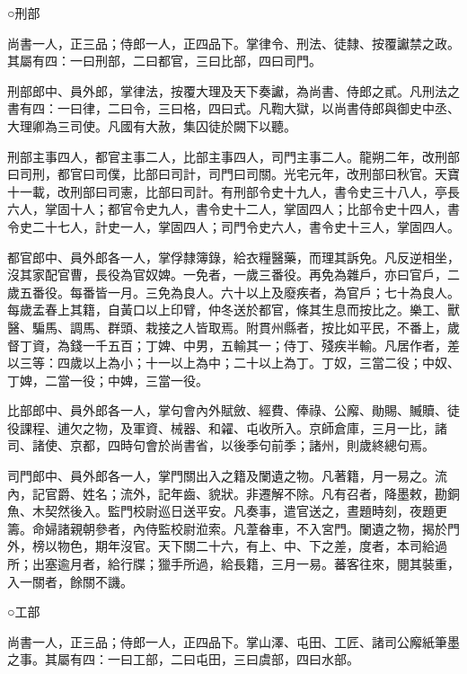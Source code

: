 \begin{pinyinscope}
 ○刑部



 尚書一人，正三品；侍郎一人，正四品下。掌律令、刑法、徒隸、按覆讞禁之政。其屬有四：一曰刑部，二曰都官，三曰比部，四曰司門。



 刑部郎中、員外郎，掌律法，按覆大理及天下奏讞，為尚書、侍郎之貳。凡刑法之書有四：一曰律，二曰令，三曰格，四曰式。凡鞫大獄，以尚書侍郎與御史中丞、大理卿為三司使。凡國有大赦，集囚徒於闕下以聽。



 刑部主事四人，都官主事二人，比部主事四人，司門主事二人。龍朔二年，改刑部曰司刑，都官曰司僕，比部曰司計，司門曰司關。光宅元年，改刑部曰秋官。天寶十一載，改刑部曰司憲，比部曰司計。有刑部令史十九人，書令史三十八人，亭長六人，掌固十人；都官令史九人，書令史十二人，掌固四人；比部令史十四人，書令史二十七人，計史一人，掌固四人；司門令史六人，書令史十三人，掌固四人。



 都官郎中、員外郎各一人，掌俘隸簿錄，給衣糧醫藥，而理其訴免。凡反逆相坐，沒其家配官曹，長役為官奴婢。一免者，一歲三番役。再免為雜戶，亦曰官戶，二歲五番役。每番皆一月。三免為良人。六十以上及廢疾者，為官戶；七十為良人。每歲孟春上其籍，自黃口以上印臂，仲冬送於都官，條其生息而按比之。樂工、獸醫、騙馬、調馬、群頭、栽接之人皆取焉。附貫州縣者，按比如平民，不番上，歲督丁資，為錢一千五百；丁婢、中男，五輸其一；侍丁、殘疾半輸。凡居作者，差以三等：四歲以上為小；十一以上為中；二十以上為丁。丁奴，三當二役；中奴、丁婢，二當一役；中婢，三當一役。



 比部郎中、員外郎各一人，掌句會內外賦斂、經費、俸祿、公廨、勛賜、贓贖、徒役課程、逋欠之物，及軍資、械器、和糴、屯收所入。京師倉庫，三月一比，諸司、諸使、京都，四時句會於尚書省，以後季句前季；諸州，則歲終總句焉。



 司門郎中、員外郎各一人，掌門關出入之籍及闌遺之物。凡著籍，月一易之。流內，記官爵、姓名；流外，記年齒、貌狀。非遷解不除。凡有召者，降墨敕，勘銅魚、木契然後入。監門校尉巡日送平安。凡奏事，遣官送之，晝題時刻，夜題更籌。命婦諸親朝參者，內侍監校尉涖索。凡葦畚車，不入宮門。闌遺之物，揭於門外，榜以物色，期年沒官。天下關二十六，有上、中、下之差，度者，本司給過所；出塞逾月者，給行牒；獵手所過，給長籍，三月一易。蕃客往來，閱其裝重，入一關者，餘關不譏。



 ○工部



 尚書一人，正三品；侍郎一人，正四品下。掌山澤、屯田、工匠、諸司公廨紙筆墨之事。其屬有四：一曰工部，二曰屯田，三曰虞部，四曰水部。




\end{pinyinscope}

